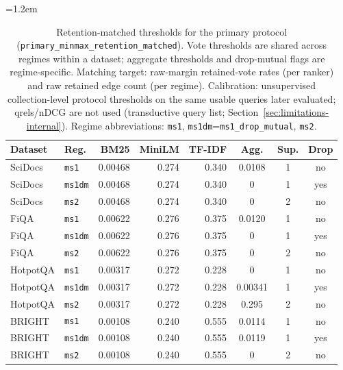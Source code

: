 \documentclass[pdflatex,sn-basic,Numbered]{sn-jnl}
\newcommand{\sncstable}{%
  \footnotesize
  \renewcommand{\arraystretch}{1.28}%
  \setlength{\tabcolsep}{3.8pt}%
  \tolerance=2000%
  \emergencystretch=1.2em%
  \hyphenpenalty=200\exhyphenpenalty=200\relax
}
\begin{document}
\begin{table}[t]
  \caption{Retention-matched thresholds for the primary protocol
    (\texttt{primary\_minmax\_retention\_matched}). Vote thresholds are
    shared across regimes within a dataset; aggregate thresholds and
    drop-mutual flags are regime-specific. Matching target: raw-margin
    retained-vote rates (per ranker) and raw retained edge count (per
    regime). Calibration: unsupervised collection-level protocol thresholds
    on the same usable queries later evaluated; qrels/nDCG are not used
    (transductive query list; Section~\ref{sec:limitations-internal}).
    Regime abbreviations: \texttt{ms1},
    \texttt{ms1dm}=\texttt{ms1\_drop\_mutual}, \texttt{ms2}.}
  \label{tab:thresholds}
  \sncstable
  \begin{tabular}{@{}llrrrccc@{}}
    \toprule
    Dataset & Reg. & BM25 & MiniLM & TF-IDF & Agg. & Sup. & Drop \\
    \midrule
    SciDocs & \texttt{ms1} & 0.00468 & 0.274 & 0.340 & 0.0108 & 1 & no \\
    \addlinespace
    SciDocs & \texttt{ms1dm} & 0.00468 & 0.274 & 0.340 & 0 & 1 & yes \\
    \addlinespace
    SciDocs & \texttt{ms2} & 0.00468 & 0.274 & 0.340 & 0 & 2 & no \\
    \addlinespace
    FiQA & \texttt{ms1} & 0.00622 & 0.276 & 0.375 & 0.0120 & 1 & no \\
    \addlinespace
    FiQA & \texttt{ms1dm} & 0.00622 & 0.276 & 0.375 & 0 & 1 & yes \\
    \addlinespace
    FiQA & \texttt{ms2} & 0.00622 & 0.276 & 0.375 & 0 & 2 & no \\
    \addlinespace
    HotpotQA & \texttt{ms1} & 0.00317 & 0.272 & 0.228 & 0 & 1 & no \\
    \addlinespace
    HotpotQA & \texttt{ms1dm} & 0.00317 & 0.272 & 0.228 & 0.00341 & 1 & yes \\
    \addlinespace
    HotpotQA & \texttt{ms2} & 0.00317 & 0.272 & 0.228 & 0.295 & 2 & no \\
    \addlinespace
    BRIGHT & \texttt{ms1} & 0.00108 & 0.240 & 0.555 & 0.0114 & 1 & no \\
    \addlinespace
    BRIGHT & \texttt{ms1dm} & 0.00108 & 0.240 & 0.555 & 0.0119 & 1 & yes \\
    \addlinespace
    BRIGHT & \texttt{ms2} & 0.00108 & 0.240 & 0.555 & 0 & 2 & no \\
    \bottomrule
  \end{tabular}
\end{table}
\end{document}
